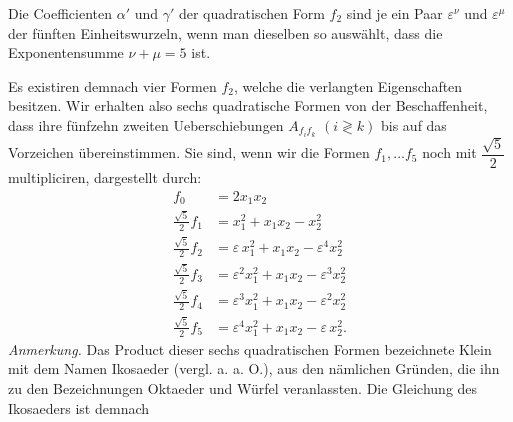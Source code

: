 \glqq Die Coefficienten $\alpha'$ und $\gamma'$ der quadratischen Form $f_2$ sind je ein Paar $\varepsilon^\nu$ und $\varepsilon^\mu$ der fünften Einheitswurzeln, wenn man dieselben so auswählt, dass die Exponentensumme $\nu+\mu=5$ ist.\grqq{}

Es existiren demnach vier Formen $f_2$, welche die verlangten Eigenschaften besitzen. Wir erhalten also sechs quadratische Formen von der Beschaffenheit, dass ihre fünfzehn zweiten Ueberschiebungen $A_{f_if_k}$ $(i\gtrless k)$ bis auf das Vorzeichen übereinstimmen. Sie sind, wenn wir die Formen $f_1,\dots f_5$ noch mit $\dfrac{\sqrt5}{2}$ multipliciren, dargestellt durch:
\[
\begin{aligned}
f_0 &= 2x_1x_2 \\
\frac{\sqrt5}{2}f_1 &= x_1^2 + x_1x_2 - x_2^2 \\
\frac{\sqrt5}{2}f_2 &= \varepsilon\,x_1^2 + x_1x_2 - \varepsilon^4 x_2^2 \\
\frac{\sqrt5}{2}f_3 &= \varepsilon^2 x_1^2 + x_1x_2 - \varepsilon^3 x_2^2 \\
\frac{\sqrt5}{2}f_4 &= \varepsilon^3 x_1^2 + x_1x_2 - \varepsilon^2 x_2^2 \\
\frac{\sqrt5}{2}f_5 &= \varepsilon^4 x_1^2 + x_1x_2 - \varepsilon\, x_2^2.
\end{aligned}
\]
\textit{Anmerkung.} Das Product dieser sechs quadratischen Formen bezeichnete Klein mit dem Namen \glqq Ikosaeder\grqq{} (vergl. a. a. O.), aus den nämlichen Gründen, die ihn zu den Bezeichnungen \glqq Oktaeder\grqq{} und \glqq Würfel\grqq{} veranlassten. Die Gleichung des Ikosaeders ist demnach


